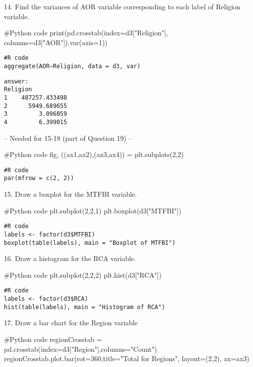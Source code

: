 \documentclass{article}
\begin{document}
14.	Find the variances of AOR variable corresponding to each label of Religion variable.
\begin{pythoncode}
#Python code
print(pd.crosstab(index=d3["Religion"], columns=d3["AOR"]).var(axis=1))
\end{pythoncode}

\begin{verbatim}
#R code
aggregate(AOR~Religion, data = d3, var)
\end{verbatim}

\begin{verbatim}
answer: 
Religion
1    487257.433498
2      5949.689655
3         3.096059
4         6.399015
\end{verbatim}


-- Needed for 15-18 (part of Question 19) --
\begin{pythoncode}
#Python code
fig, ((ax1,ax2),(ax3,ax4)) = plt.subplots(2,2)
\end{pythoncode}

\begin{verbatim}
#R code
par(mfrow = c(2, 2))

\end{verbatim}

15.	Draw a boxplot for the MTFBI variable.
\begin{pythoncode}
#Python code
plt.subplot(2,2,1)
plt.boxplot(d3["MTFBI"])
\end{pythoncode}

\begin{verbatim}
#R code
labels <- factor(d3$MTFBI)
boxplot(table(labels), main = "Boxplot of MTFBI")

\end{verbatim}

16.	Draw a histogram for the RCA variable.
\begin{pythoncode}
#Python code
plt.subplot(2,2,2)
plt.hist(d3["RCA"])
\end{pythoncode}

\begin{verbatim}
#R code
labels <- factor(d3$RCA)
hist(table(labels), main = "Histogram of RCA")

\end{verbatim}

17.	Draw a bar chart for the Region variable
\begin{pythoncode}
#Python code
regionCrosstab = pd.crosstab(index=d3["Region"],columns="Count")
regionCrosstab.plot.bar(rot=360,title="Total for Regions", layout=(2,2), ax=ax3)
\end{pythoncode}
\end{document}
